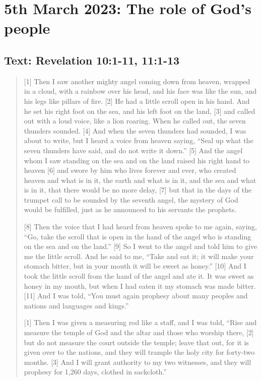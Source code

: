 \section{5th March 2023: The role of God's people}
\subsection*{Text: Revelation 10:1-11, 11:1-13}
  \begin{quote}
    [1] Then I saw another mighty angel coming down from heaven, wrapped in a
    cloud, with a rainbow over his head, and his face was like the sun, and
    his legs like pillars of fire.  [2] He had a little scroll open in his
    hand.  And he set his right foot on the sea, and his left foot on the
    land, [3] and called out with a loud voice, like a lion roaring.  When he
    called out, the seven thunders sounded.  [4] And when the seven thunders
    had sounded, I was about to write, but I heard a voice from heaven
    saying, “Seal up what the seven thunders have said, and do not write it
    down.” [5] And the angel whom I saw standing on the sea and on the land
    raised his right hand to heaven [6] and swore by him who lives forever
    and ever, who created heaven and what is in it, the earth and what is in
    it, and the sea and what is in it, that there would be no more delay, [7]
    but that in the days of the trumpet call to be sounded by the seventh
    angel, the mystery of God would be fulfilled, just as he announced to his
    servants the prophets.

    [8] Then the voice that I had heard from heaven spoke to me again,
    saying, “Go, take the scroll that is open in the hand of the angel who is
    standing on the sea and on the land.” [9] So I went to the angel and told
    him to give me the little scroll.  And he said to me, “Take and eat it;
    it will make your stomach bitter, but in your mouth it will be sweet as
    honey.” [10] And I took the little scroll from the hand of the angel and
    ate it.  It was sweet as honey in my mouth, but when I had eaten it my
    stomach was made bitter.  [11] And I was told, “You must again prophesy
    about many peoples and nations and languages and kings.”

    [1] Then I was given a measuring rod like a staff, and I was told, “Rise
    and measure the temple of God and the altar and those who worship there,
    [2] but do not measure the court outside the temple; leave that out, for
    it is given over to the nations, and they will trample the holy city for
    forty-two months.  [3] And I will grant authority to my two witnesses,
    and they will prophesy for 1,260 days, clothed in sackcloth.”


\end{quote}
